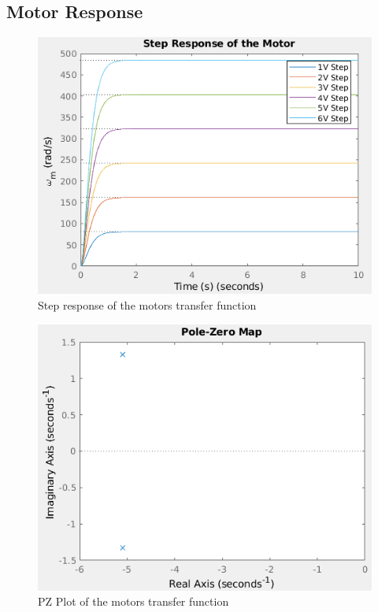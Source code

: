 \documentclass[a4paper, 11pt, compsoc]{IEEEtran}
\begin{document}
        \subsection{Motor Response}
            \begin{figure}[!h]
                \centering
                \includegraphics[width=\columnwidth]{motorStepResponse.png}
                \caption{Step response of the motors transfer function}
                \label{fig:motorStepResponse}
            \end{figure}
            \begin{figure}[!h]
                \centering
                \includegraphics[width=\columnwidth]{motorPZMap.png}
                \caption{PZ Plot of the motors transfer function}
                \label{fig:motorPZ}
            \end{figure}
\end{document}
